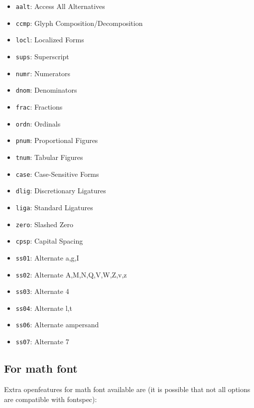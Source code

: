 \documentclass[a4paper]{scrartcl}
\newcommand*{\opt}[1]{\texttt{#1}}
\begin{document}
\begin{itemize}
  \item \opt{aalt}: Access All Alternatives
  \item \opt{ccmp}: Glyph Composition/Decomposition
  \item \opt{locl}: Localized Forms
  \item \opt{sups}: Superscript
  \item \opt{numr}: Numerators
  \item \opt{dnom}: Denominators
  \item \opt{frac}: Fractions
  \item \opt{ordn}: Ordinals
  \item \opt{pnum}: Proportional Figures
  \item \opt{tnum}: Tabular Figures
  \item \opt{case}: Case-Sensitive Forms
  \item \opt{dlig}: Discretionary Ligatures
  \item \opt{liga}: Standard Ligatures
  \item \opt{zero}: Slashed Zero
  \item \opt{cpsp}: Capital Spacing
  \item \opt{ss01}: Alternate a,g,I
  \item \opt{ss02}: Alternate A,M,N,Q,V,W,Z,v,z
  \item \opt{ss03}: Alternate 4
  \item \opt{ss04}: Alternate l,t
  \item \opt{ss06}: Alternate ampersand
  \item \opt{ss07}: Alternate 7
\end{itemize}

%
%
%
%
%
%
%

\pagebreak

\subsection{For math font}

Extra openfeatures for math font available are (it is possible that not all options are compatible with fontspec):
\end{document}
